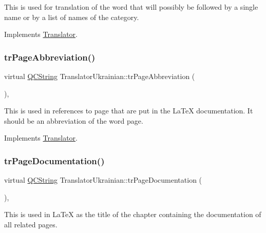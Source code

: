 This is used for translation of the word that will possibly be followed by a single name or by a list of names of the category. 

Implements \mbox{\hyperlink{class_translator}{Translator}}.

\mbox{\label{class_translator_ukrainian_a6d0a7724283f6abcb30d143d17366e39}} 
\subsubsection{\texorpdfstring{trPageAbbreviation()}{trPageAbbreviation()}}
{\footnotesize\ttfamily virtual \mbox{\hyperlink{class_q_c_string}{Q\+C\+String}} Translator\+Ukrainian\+::tr\+Page\+Abbreviation (\begin{DoxyParamCaption}{ }\end{DoxyParamCaption})\hspace{0.3cm}{\ttfamily [inline]}, {\ttfamily [virtual]}}

This is used in references to page that are put in the La\+TeX documentation. It should be an abbreviation of the word page. 

Implements \mbox{\hyperlink{class_translator}{Translator}}.

\mbox{\label{class_translator_ukrainian_aa51115931e256db31cf796f29378aa25}} 
\subsubsection{\texorpdfstring{trPageDocumentation()}{trPageDocumentation()}}
{\footnotesize\ttfamily virtual \mbox{\hyperlink{class_q_c_string}{Q\+C\+String}} Translator\+Ukrainian\+::tr\+Page\+Documentation (\begin{DoxyParamCaption}{ }\end{DoxyParamCaption})\hspace{0.3cm}{\ttfamily [inline]}, {\ttfamily [virtual]}}

This is used in La\+TeX as the title of the chapter containing the documentation of all related pages. 

